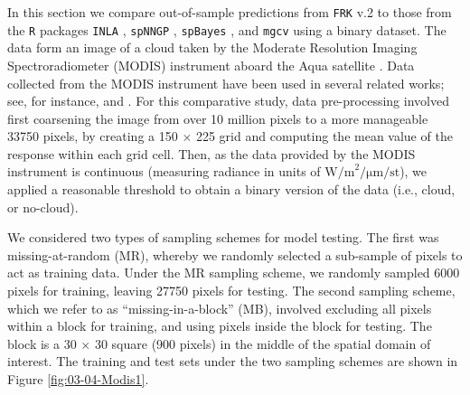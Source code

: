 \documentclass[12pt,a4paper]{article}
\begin{document}
In this section we compare out-of-sample predictions from \texttt{FRK} v.2 to those from the \texttt{R} packages \texttt{INLA} \citep{Lindgren_2015_R-INLA},  \texttt{spNNGP} \citep{Finley_2020_spNNGP}, \texttt{spBayes} \citep{Finley_2015_spBayes}, and \texttt{mgcv} \citep{Wood_2017_GAM:R} using a binary dataset. 
The data form an image of a cloud taken by the Moderate Resolution Imaging Spectroradiometer (MODIS) instrument aboard the Aqua satellite \citep{MODIS_satelitte}. 
Data collected from the MODIS instrument have been used in several related works; see, for instance, \cite{Sengupta_2016_MODIS} and  \cite{ZammitMangion_2021_Deep_compositional_spatial_model}.
For this comparative study, data pre-processing involved first coarsening the image from over 10 million pixels to a more manageable 33750 pixels, by creating a 150 $\times$ 225 grid and computing the mean value of the response within each grid cell. 
Then, as the data provided by the MODIS instrument is continuous (measuring radiance in units of $\text{W/m}^2/\si{\um}/\text{st}$), we applied a reasonable threshold to obtain a binary version of the data (i.e., cloud, or no-cloud).





 We considered two types of sampling schemes for model testing.
 The first was missing-at-random (MR), whereby we randomly selected a sub-sample of pixels to act as training data.
 Under the MR sampling scheme, we randomly sampled 6000 pixels for training, leaving 27750 pixels for testing. 
 The second sampling scheme, which we refer to as ``missing-in-a-block'' (MB), involved excluding all pixels within a block for training, and using pixels inside the block for testing. 
 The block is a 30 $\times$ 30 square (900 pixels) in the middle of the spatial domain of interest. 
The training and test sets under the two sampling schemes are shown in Figure \ref{fig:03-04-Modis1}.
\end{document}
